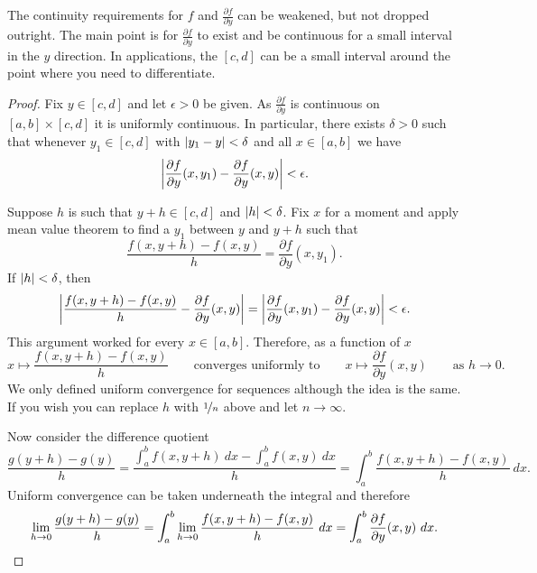 The continuity requirements for $f$ and
$\frac{\partial f}{\partial y}$ can be
weakened, but not dropped outright.  The main point is for
$\frac{\partial f}{\partial y}$ to exist and be continuous for a small
interval in the $y$ direction.  In applications, the $[c,d]$ can be a
small interval around the point where you need to differentiate.

\begin{proof}
Fix $y \in [c,d]$ and let $\epsilon > 0$ be given.
As $\frac{\partial f}{\partial y}$ is continuous on $[a,b] \times [c,d]$ it
is uniformly continuous.  In particular, there exists $\delta > 0$ such that
whenever $y_1 \in [c,d]$ with
$\left\lvert {y_1-y} \right\rvert < \delta$ and all $x \in [a,b]$ we have
\begin{equation*}
\left\lvert {\frac{\partial f}{\partial y}(x,y_1)-\frac{\partial f}{\partial y}(x,y)} \right\rvert < \epsilon .
\end{equation*}

Suppose $h$ is such that $y+h \in [c,d]$ and $\left\lvert {h} \right\rvert < \delta$.
Fix $x$ for a moment
and apply mean value theorem to find a $y_1$ between $y$ and $y+h$ such that
\begin{equation*}
\frac{f(x,y+h)-f(x,y)}{h}
=
\frac{\partial f}{\partial y}(x,y_1) .
\end{equation*}
If $\left\lvert {h} \right\rvert < \delta$, then
\begin{equation*}
\left\lvert {
\frac{f(x,y+h)-f(x,y)}{h}
-
\frac{\partial f}{\partial y}(x,y) 
} \right\rvert
=
\left\lvert {
\frac{\partial f}{\partial y}(x,y_1) 
-
\frac{\partial f}{\partial y}(x,y) 
} \right\rvert
< \epsilon .
\end{equation*}
This argument worked for every $x \in [a,b]$.  Therefore, as a function of
$x$
\begin{equation*}
x \mapsto \frac{f(x,y+h)-f(x,y)}{h}
\qquad
\text{converges uniformly to}
\qquad
x \mapsto \frac{\partial f}{\partial y}(x,y)
\qquad
\text{as $h \to 0$} .
\end{equation*}
We only defined uniform convergence for sequences although the idea is the
same.  If you wish you can replace $h$ with $\nicefrac{1}{n}$ above and let
$n \to \infty$.

Now consider the difference quotient
\begin{equation*}
\frac{g(y+h)-g(y)}{h}
=
\frac{\int_a^b f(x,y+h) ~dx -
\int_a^b f(x,y) ~dx }{h}
=
\int_a^b \frac{f(x,y+h)-f(x,y)}{h} ~dx .
\end{equation*}
Uniform convergence can be taken underneath the integral and therefore
\begin{equation*}
\lim_{h\to 0}
\frac{g(y+h)-g(y)}{h}
= 
\int_a^b 
\lim_{h\to 0}
\frac{f(x,y+h)-f(x,y)}{h} ~dx 
=
\int_a^b 
\frac{\partial f}{\partial y}(x,y) ~dx . \qedhere
\end{equation*}
\end{proof}


